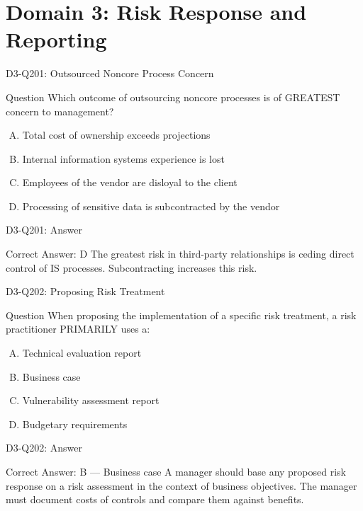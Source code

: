 \documentclass{beamer}
\begin{document}
	\section{Domain 3: Risk Response and Reporting}
	
	\begin{frame}{D3-Q201: Outsourced Noncore Process Concern}
		\begin{block}{Question}
			Which outcome of outsourcing noncore processes is of GREATEST concern to management?
		\end{block}
		\begin{enumerate}[(A)]
			\item Total cost of ownership exceeds projections
			\item Internal information systems experience is lost
			\item Employees of the vendor are disloyal to the client
			\item Processing of sensitive data is subcontracted by the vendor
		\end{enumerate}
	\end{frame}
	\begin{frame}{D3-Q201: Answer}
		\begin{block}{Correct Answer: D}
			The greatest risk in third-party relationships is ceding direct control of IS processes. Subcontracting increases this risk.
		\end{block}
	\end{frame}
	
	\begin{frame}{D3-Q202: Proposing Risk Treatment}
		\begin{block}{Question}
			When proposing the implementation of a specific risk treatment, a risk practitioner PRIMARILY uses a:
		\end{block}
		\begin{enumerate}[(A)]
			\item Technical evaluation report
			\item Business case
			\item Vulnerability assessment report
			\item Budgetary requirements
		\end{enumerate}
	\end{frame}
	\begin{frame}{D3-Q202: Answer}
		\begin{block}{Correct Answer: B --- Business case}
			A manager should base any proposed risk response on a risk assessment in the context of business objectives. The manager must document costs of controls and compare them against benefits.
		\end{block}
	\end{frame}
	
\end{document}
